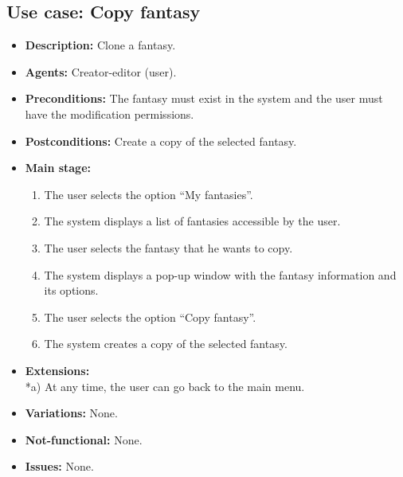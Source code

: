 \subsection{Use case: Copy fantasy}
\begin{itemize}
	\item \textbf{Description:} Clone a fantasy.
	\item \textbf{Agents:} Creator-editor (user).
	\item \textbf{Preconditions:} The fantasy must exist in the system and the user must have the modification permissions.
	\item \textbf{Postconditions:} Create a copy of the selected fantasy.
	\item \textbf{Main stage:}
	\begin{enumerate}
		\item The user selects the option ``My fantasies''.
		\item The system displays a list of fantasies accessible by the user.
		\item The user selects the fantasy that he wants to copy.
		\item The system displays a pop-up window with the fantasy information and its options.
		\item The user selects the option ``Copy fantasy''.
		\item The system creates a copy of the selected fantasy.
	\end{enumerate}
	\item \textbf{Extensions:} \\ *a) At any time, the user can go back to the main menu.
	\item \textbf{Variations:} None.
	\item \textbf{Not-functional:} None.
	\item \textbf{Issues:} None.
\end{itemize}

